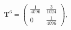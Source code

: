 \begin{align} \mathbf{T}^6 = \begin{pmatrix} \frac{1}{4096} & \frac{3}{1024} \\[4pt] 0 & \frac{1}{4096} \end{pmatrix}, \end{align}
